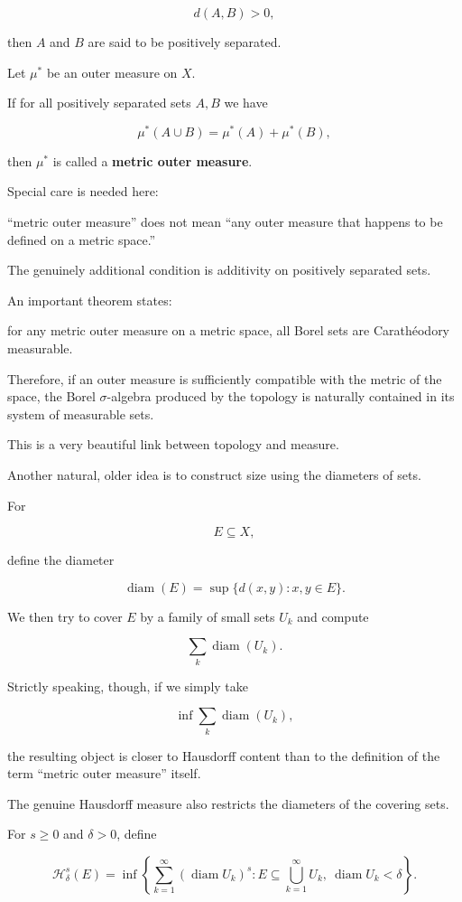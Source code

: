 \documentclass[11pt]{article}
\begin{document}
\[
d(A,B)>0,
\]

then $A$ and $B$ are said to be positively separated.

Let $\mu^{*}$ be an outer measure on $X$.

If for all positively separated sets $A,B$ we have

\[
\mu^{*}(A\cup B)=\mu^{*}(A)+\mu^{*}(B),
\]

then $\mu^{*}$ is called a \textbf{metric outer measure}.

Special care is needed here:

``metric outer measure'' does not mean ``any outer measure that happens to be defined on a metric space.''

The genuinely additional condition is additivity on positively separated sets.

An important theorem states:

for any metric outer measure on a metric space, all Borel sets are Carathéodory measurable.

Therefore, if an outer measure is sufficiently compatible with the metric of the space, the Borel $\sigma$-algebra produced by the topology is naturally contained in its system of measurable sets.

This is a very beautiful link between topology and measure.

Another natural, older idea is to construct size using the diameters of sets.

For

\[
E\subseteq X,
\]

define the diameter


\[
\operatorname{diam}(E)=\sup\{d(x,y):x,y\in E\}.
\]

We then try to cover $E$ by a family of small sets $U_{k}$ and compute

\[
\sum_{k}\operatorname{diam}(U_{k}).
\]

Strictly speaking, though, if we simply take

\[
\inf\sum_{k}\operatorname{diam}(U_{k}),
\]

the resulting object is closer to Hausdorff content than to the definition of the term ``metric outer measure'' itself.

The genuine Hausdorff measure also restricts the diameters of the covering sets.

For $s\geq0$ and $\delta>0$, define

\[
\mathcal{H}^{s}_{\delta}(E)=\inf\left\{\sum_{k=1}^{\infty}(\operatorname{diam}U_{k})^{s}:E\subseteq\bigcup_{k=1}^{\infty}U_{k},\ \operatorname{diam}U_{k}<\delta\right\}.
\]
\end{document}
